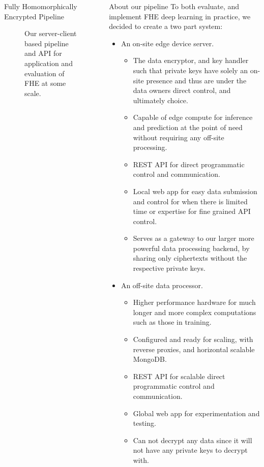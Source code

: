 \documentclass{beamer}
\begin{document}
\begin{frame}
\begin{columns}
\begin{column}{0.35\textwidth}
\begin{block}{Fully Homomorphically Encrypted Pipeline}
\begin{figure}
            \caption{Our server-client based pipeline and API for application and evaluation of FHE at some scale.}
            \label{fig:pipeline}
          \end{figure}
        \end{block}
      \end{column}
      \begin{column}{0.3\textwidth}
        \begin{block}{About our pipeline}
          To both evaluate, and implement FHE deep learning in practice, we decided to create a two part system:
          \begin{itemize}
            \item An on-site edge device server.
              \begin{itemize}
                \item The data encryptor, and key handler such that private keys have solely an on-site presence and thus are under the data owners direct control, and ultimately choice.
                \item Capable of edge compute for inference and prediction at the point of need without requiring any off-site processing.
                \item REST API for direct programmatic control and communication.
                \item Local web app for easy data submission and control for when there is limited time or expertise for fine grained API control.
                \item Serves as a gateway to our larger more powerful data processing backend, by sharing only ciphertexts without the respective private keys.
              \end{itemize}
            \item An off-site data processor.
              \begin{itemize}
                \item Higher performance hardware for much longer and more complex computations such as those in training.
                \item Configured and ready for scaling, with reverse proxies, and horizontal scalable MongoDB.
                \item REST API for scalable direct programmatic control and communication.
                \item Global web app for experimentation and testing.
                \item Can not decrypt any data since it will not have any private keys to decrypt with.
              \end{itemize}
          \end{itemize}
        \end{block}
      \end{column}
    \end{columns}


\end{frame}
\end{document}
